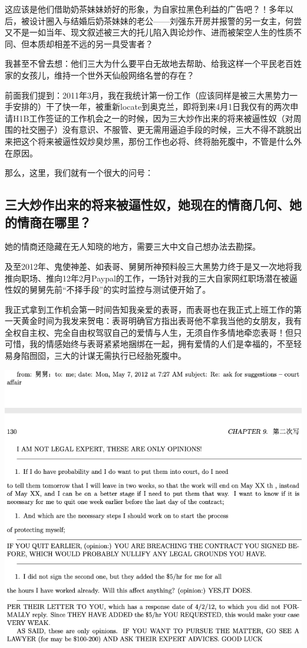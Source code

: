 \documentclass[9pt, b5paper]{article}
\begin{document}
这应该是他们借助奶茶妹妹娇好的形象，为自家拉黑色利益的广告吧？！多年以后，被设计圈入与结婚后奶茶妹妹的老公——刘强东开房并报警的另一女主，何尝又不是一如当年、现文叙述被三大的托儿陷入舆论炒作、进而被架空人生的性质不同、但本质却相差不远的另一具受害者？

我甚至不曾去想：他们三大为什么要平白无故地去帮助、给我这样一个平民老百姓家的女孩儿，维持一个世外天仙般网络名誉的存在？

前面我们提到：2011年3月，我在我统计第一份工作（应该同样是被三大黑势力一手安排的）干了快一年，被重新locate到奥克兰，即将到来4月1日我仅有的两次申请H1B工作签证的工作机会之一的时候，因为三大炒作出来的将来被逼性奴（对周围的社交圈子）没有意识、不服管、更无需用逼迫手段的时候，三大不得不跳脱出来把这个将来被逼性奴炒臭炒黑，那份工作也必将、终将胎死腹中，不管是什么外在原因。

那么，这里，我们就有一个很大的问号：

\subsection{三大炒作出来的将来被逼性奴，她现在的情商几何、她的情商在哪里？}
\label{sec:org6589f44}

她的情商还隐藏在无人知晓的地方，需要三大中文自己想办法去勘探。

及至2012年、鬼使神差、如表哥、舅舅所神预料般三大黑势力终于是又一次地将我推向职场、推向12年2月Paypal的工作，一场针对我的三大自家网红职场潜在被逼性奴的舅舅先前“不择手段”的实时监控与测试便开始了。

我正式拿到工作机会第一时间告知我亲爱的表哥，而表哥也在我正式上班工作的第一天黄金时间为我发来贺电：表哥明确官方指出表哥他不拿我当他的女朋友，我有全权自主权、完全自由权驾驭自己的爱情与人生，无须自作多情地牵恋表哥！但只可惜，我的情感始终与表哥紧紧地捆绑在一起，拥有爱情的人们是幸福的，不至轻易身陷囫囵，三大的计谋无需执行已经胎死腹中。

\begin{center}
\includegraphics[width=.9\linewidth]{./pic/readme_20210412_175551.png}
\end{center}
\end{document}

